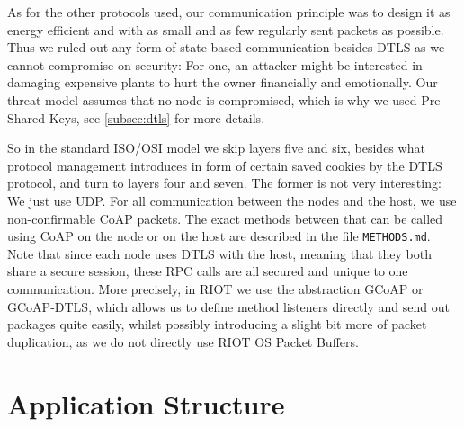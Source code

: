 \documentclass[acmtog, language=english, nonacm]{acmart}
\begin{document}
    As for the other protocols used, our communication principle was to design it as energy efficient and with as small and as few regularly sent packets as possible. Thus we ruled out any form of state based communication besides DTLS as we cannot compromise on security: For one, an attacker might be interested in damaging expensive plants to hurt the owner financially and emotionally. Our threat model assumes that no node is compromised, which is why we used Pre-Shared Keys, see \cref{subsec:dtls} for more details.

    So in the standard ISO/OSI model we skip layers five and six, besides what protocol management introduces in form of certain saved cookies by the DTLS protocol, and turn to layers four and seven. The former is not very interesting: We just use UDP. For all communication between the nodes and the host, we use non-confirmable CoAP packets. The exact methods between that can be called using CoAP on the node or on the host are described in the file \texttt{METHODS.md}. Note that since each node uses DTLS with the host, meaning that they both share a secure session, these RPC calls are all secured and unique to one communication. More precisely, in RIOT we use the abstraction GCoAP or GCoAP-DTLS, which allows us to define method listeners directly and send out packages quite easily, whilst possibly introducing a slight bit more of packet duplication, as we do not directly use RIOT OS Packet Buffers.

    \section{Application Structure}
\end{document}
